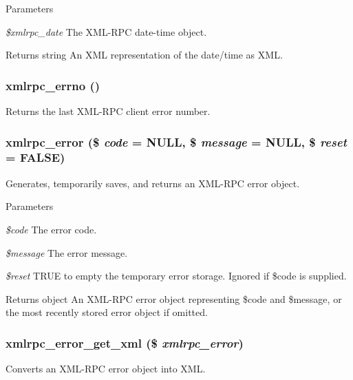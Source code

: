 \begin{DoxyParams}{Parameters}
\item[{\em \$xmlrpc\_\-date}]The XML-\/RPC date-\/time object.\end{DoxyParams}
\begin{DoxyReturn}{Returns}
string An XML representation of the date/time as XML. 
\end{DoxyReturn}
\hypertarget{xmlrpc_8inc_af9d29505279c00e66545f3859550ff88}{
\subsubsection[{xmlrpc\_\-errno}]{\setlength{\rightskip}{0pt plus 5cm}xmlrpc\_\-errno ()}}
\label{xmlrpc_8inc_af9d29505279c00e66545f3859550ff88}
Returns the last XML-\/RPC client error number. \hypertarget{xmlrpc_8inc_aabf20dbe18bd511ce0aceedc087a15fd}{
\subsubsection[{xmlrpc\_\-error}]{\setlength{\rightskip}{0pt plus 5cm}xmlrpc\_\-error (\$ {\em code} = {\ttfamily NULL}, \/  \$ {\em message} = {\ttfamily NULL}, \/  \$ {\em reset} = {\ttfamily FALSE})}}
\label{xmlrpc_8inc_aabf20dbe18bd511ce0aceedc087a15fd}
Generates, temporarily saves, and returns an XML-\/RPC error object.


\begin{DoxyParams}{Parameters}
\item[{\em \$code}]The error code. \item[{\em \$message}]The error message. \item[{\em \$reset}]TRUE to empty the temporary error storage. Ignored if \$code is supplied.\end{DoxyParams}
\begin{DoxyReturn}{Returns}
object An XML-\/RPC error object representing \$code and \$message, or the most recently stored error object if omitted. 
\end{DoxyReturn}
\hypertarget{xmlrpc_8inc_aaca4578f8a9f0c150c056f61aa62e806}{
\subsubsection[{xmlrpc\_\-error\_\-get\_\-xml}]{\setlength{\rightskip}{0pt plus 5cm}xmlrpc\_\-error\_\-get\_\-xml (\$ {\em xmlrpc\_\-error})}}
\label{xmlrpc_8inc_aaca4578f8a9f0c150c056f61aa62e806}
Converts an XML-\/RPC error object into XML.


